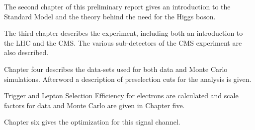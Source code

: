The second chapter of this preliminary report gives an introduction to the Standard Model and the theory behind the need for the Higgs boson.

The third chapter describes the experiment, including both an introduction to the LHC and the CMS.  The various sub-detectors of the CMS experiment are also described.

Chapter four describes the data-sets used for both data and Monte Carlo simulations.  Afterword a description of preselection cuts for the analysis is given.


Trigger and Lepton Selection Efficiency for electrons are calculated and scale factors for data and Monte Carlo are given in Chapter five.


Chapter six gives the optimization for this signal channel.





